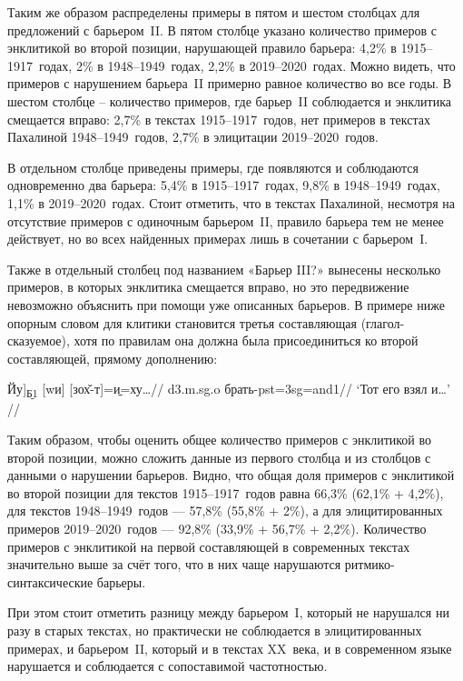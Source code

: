 Таким же образом распределены примеры в пятом и шестом столбцах для предложений с барьером~II. В пятом столбце указано количество примеров с энклитикой во второй позиции, нарушающей правило барьера: 4,2\% в 1915–1917~годах, 2\% в 1948–1949~годах, 2,2\% в 2019–2020~годах. Можно видеть, что примеров с нарушением барьера~II примерно равное количество во все годы. В шестом столбце – количество примеров, где барьер~II соблюдается и энклитика смещается вправо: 2,7\% в текстах 1915–1917~годов, нет примеров в текстах Пахалиной 1948–1949~годов, 2,7\% в элицитации 2019–2020~годов.

В отдельном столбце приведены примеры, где появляются и соблюдаются одновременно два барьера: 5,4\% в 1915–1917~годах, 9,8\% в 1948–1949~годах, 1,1\% в 2019–2020~годах. Стоит отметить, что в текстах Пахалиной, несмотря на отсутствие примеров с одиночным барьером~II, правило барьера тем не менее действует, но во всех найденных примерах лишь в сочетании с барьером~I.

Также в отдельный столбец под названием «Барьер III?» вынесены несколько примеров, в которых энклитика смещается вправо, но это передвижение невозможно объяснить при помощи уже описанных барьеров. В примере ниже опорным словом для клитики становится третья составляющая (глагол-сказуемое), хотя по правилам она должна была присоединиться ко второй составляющей, прямому дополнению:

\begingl
\gla {[}Йу{]}\textsubscript{\b{Б1}} {[}wи{]} {[}зох̌-т{]}=\b{и}=ху…//
 {\sc d3.m.sg.o} брать-{\sc pst=3sg=and1}//
\glft ‘Тот его взял и…’ //
\endgl \xe

Таким образом, чтобы оценить общее количество примеров с энклитикой во второй позиции, можно сложить данные из первого столбца и из столбцов с данными о нарушении барьеров. Видно, что общая доля примеров с энклитикой во второй позиции для текстов 1915–1917~годов равна 66,3\% (62,1\% + 4,2\%), для текстов 1948–1949~годов — 57,8\% (55,8\% + 2\%), а для элицитированных примеров 2019–2020~годов — 92,8\% (33,9\% + 56,7\% + 2,2\%). Количество примеров с энклитикой на первой составляющей в современных текстах значительно выше за счёт того, что в них чаще нарушаются ритмико-синтаксические барьеры.

При этом стоит отметить разницу между барьером~I, который не нарушался ни разу в старых текстах, но практически не соблюдается в элицитированных примерах, и барьером~II, который и в текстах XX~века, и в современном языке нарушается и соблюдается с сопоставимой частотностью.

